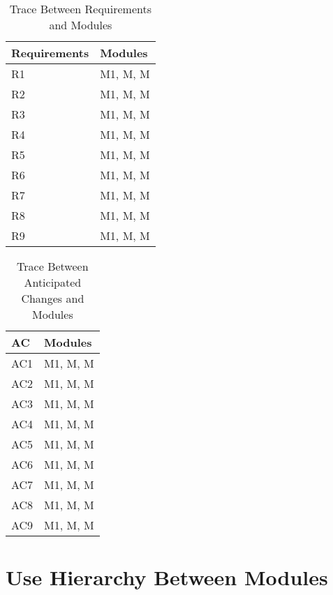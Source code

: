 \documentclass[12pt,letterpaper]{article}
\begin{document}
\begin{table}[h!]
\centering
\begin{tabular}{p{} p{}}
\toprule
\textbf{Requirements} & \textbf{Modules}\\
\midrule
{R1} & M1, M, M \\
{R2} & M1, M, M \\
{R3} & M1, M, M \\
{R4} & M1, M, M \\
{R5} & M1, M, M \\
{R6} & M1, M, M \\
{R7} & M1, M, M \\
{R8} & M1, M, M \\
{R9} & M1, M, M \\
\bottomrule
\end{tabular}
\caption{Trace Between Requirements and Modules}
\label{TblRT}
\end{table}
\begin{table}[h!]
\centering
\begin{tabular}{p{} p{}}
\toprule
\textbf{AC} & \textbf{Modules}\\
\midrule
{AC1} & M1, M, M \\
{AC2} & M1, M, M \\
{AC3} & M1, M, M \\
{AC4} & M1, M, M \\
{AC5} & M1, M, M \\
{AC6} & M1, M, M \\
{AC7} & M1, M, M \\
{AC8} & M1, M, M \\
{AC9} & M1, M, M \\
\bottomrule
\end{tabular}
\caption{Trace Between Anticipated Changes and Modules}
\label{TblACT}
\end{table}

	\section{Use Hierarchy Between Modules}
\end{document}
